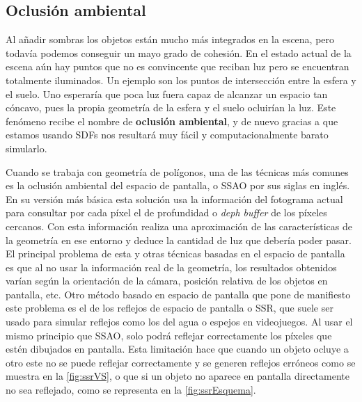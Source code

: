 \subsection{Oclusión ambiental}
Al añadir sombras los objetos están mucho más integrados en la escena, pero todavía podemos conseguir un mayo grado de cohesión. En el estado actual de la escena aún hay puntos que no es convincente que reciban luz pero se encuentran totalmente iluminados. Un ejemplo son los puntos de intersección entre la esfera y el suelo. Uno esperaría que poca luz fuera capaz de alcanzar un espacio tan cóncavo, pues la propia geometría de la esfera y el suelo ocluirían la luz. Este fenómeno recibe el nombre de \textbf{oclusión ambiental}, y de nuevo gracias a que estamos usando SDFs nos resultará muy fácil y computacionalmente barato simularlo.\newline

Cuando se trabaja con geometría de polígonos, una de las técnicas más comunes es la oclusión ambiental del espacio de pantalla, o SSAO por sus siglas en inglés. En su versión más básica esta solución usa la información del fotograma actual para consultar por cada píxel el  de profundidad o \textit{deph buffer} de los píxeles cercanos. Con esta información realiza una aproximación de las características de la geometría en ese entorno y deduce la cantidad de luz que debería poder pasar. El principal problema de esta y otras técnicas basadas en el espacio de pantalla es que al no usar la información real de la geometría, los resultados obtenidos varían según la orientación de la cámara, posición relativa de los objetos en pantalla, etc. Otro método basado en espacio de pantalla que pone de manifiesto este problema es el de los reflejos de espacio de pantalla o SSR, que suele ser usado para simular reflejos como los del agua o espejos en videojuegos. Al usar el mismo principio que SSAO, solo podrá reflejar correctamente los píxeles que estén dibujados en pantalla. Esta limitación hace que cuando un objeto ocluye a otro este no se puede reflejar correctamente y se generen reflejos erróneos como se muestra en la \autoref{fig:ssrVS}, o que si un objeto no aparece en pantalla directamente no sea reflejado, como se representa en la \autoref{fig:ssrEsquema}.

